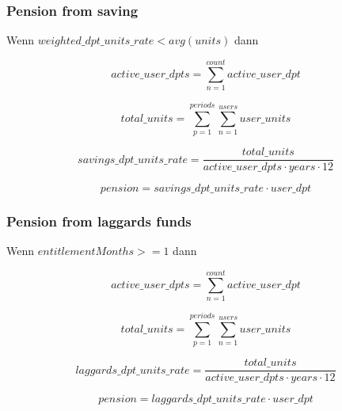 \subsubsection*{Pension from saving}

Wenn $weighted\_dpt\_units\_rate < avg(units)$ dann 

\begin{equation}
	active\_user\_dpts = 
	\sum_{n=1}^{count} active\_user\_dpt
\end{equation}

\begin{equation}
	total\_units = 	
	\sum_{p=1}^{periods} \sum_{n=1}^{users} user\_units	
\end{equation}

\begin{equation}
	savings\_dpt\_units\_rate = 	
	\frac{total\_units} 
	{active\_user\_dpts \cdot years \cdot 12}		
\end{equation}

\begin{equation}
	pension = savings\_dpt\_units\_rate \cdot user\_dpt
\end{equation}


\subsubsection*{Pension from laggards funds}

Wenn $entitlementMonths >= 1$ dann 

\begin{equation}
	active\_user\_dpts = 
	\sum_{n=1}^{count} active\_user\_dpt
\end{equation}

\begin{equation}
	total\_units = 	
	\sum_{p=1}^{periods} \sum_{n=1}^{users} user\_units	
\end{equation}

\begin{equation}
	laggards\_dpt\_units\_rate = 	
	\frac{total\_units} 
	{active\_user\_dpts \cdot years \cdot 12}		
\end{equation}

\begin{equation}
	pension = laggards\_dpt\_units\_rate \cdot user\_dpt
\end{equation}
